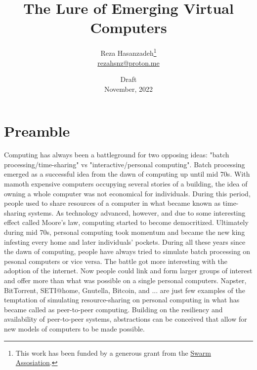 \documentclass[a4paper, 10pt]{article}
\title{The Lure of Emerging Virtual Computers}
\author{Reza Hasanzadeh\thanks{This work has been funded by a generous grant from the \href{https://my.ethswarm.org/grants}{Swarm Assosiation}.}  \\ \href{mailto:rezahsnz@proton.me}{\small{rezahsnz@proton.me}}}
\date{\footnotesize{Draft} \\ \footnotesize{November, 2022}}
\begin{document}

\maketitle

\section{Preamble}
Computing has always been a battleground for two opposing ideas: "batch processing/time-sharing" vs "interactive/personal computing". Batch processing emerged as a successful idea from the dawn of computing up until mid 70s. With mamoth expensive computers occupying several stories of a building, the idea of owning a whole computer was not economical for individuals. During this period, people used to share resources of a computer in what became known as time-sharing systems. As technology advanced, however, and due to some interesting effect called Moore's law, computing started to become democritized. Ultimately during mid 70s, personal computing took momentum and became the new king infesting every home and later individuals' pockets. During all these years since the dawn of computing, people have always tried to simulate batch processing on pesonal computers or vice versa. The battle got more interesting with the adoption of the internet. Now people could link and form larger groups of interest and offer more than what was possible on a single personal computers. Napster, BitTorrent, SETI@home, Gnutella, Bitcoin, and ... are just few examples of the temptation of simulating resource-sharing on personal computing in what has became called as peer-to-peer computing\cite{milo:2002}. Building on the resiliency and availability of peer-to-peer systems, abstractions can be conceived that allow for new models of computers to be made possible. 
\end{document}
